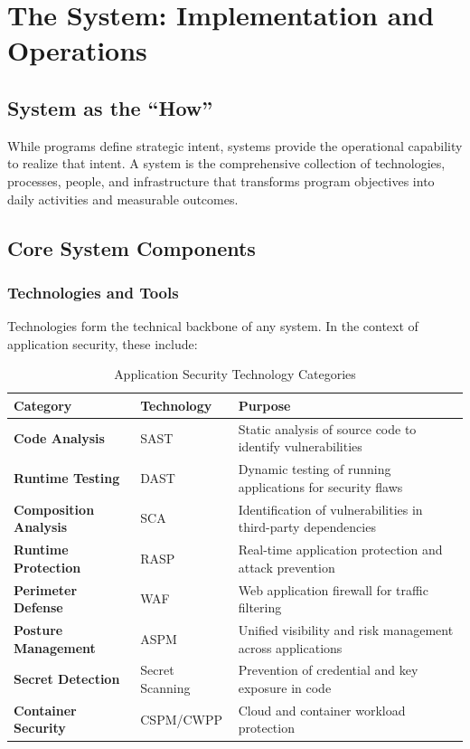 \documentclass[11pt,letterpaper]{article}
\begin{document}
\section{The System: Implementation and Operations}

\subsection{System as the ``How''}

While programs define strategic intent, systems provide the operational capability to realize that intent. A system is the comprehensive collection of technologies, processes, people, and infrastructure that transforms program objectives into daily activities and measurable outcomes.

\subsection{Core System Components}

\subsubsection{Technologies and Tools}

Technologies form the technical backbone of any system. In the context of application security, these include:

\begin{table}[H]
\centering
\renewcommand{\arraystretch}{1.3}
\begin{tabularx}{\textwidth}{>{\bfseries}l l X}
\toprule
\textbf{Category} & \textbf{Technology} & \textbf{Purpose} \\
\midrule
Code Analysis & SAST & Static analysis of source code to identify vulnerabilities \\
Runtime Testing & DAST & Dynamic testing of running applications for security flaws \\
Composition Analysis & SCA & Identification of vulnerabilities in third-party dependencies \\
Runtime Protection & RASP & Real-time application protection and attack prevention \\
Perimeter Defense & WAF & Web application firewall for traffic filtering \\
Posture Management & ASPM & Unified visibility and risk management across applications \\
Secret Detection & Secret Scanning & Prevention of credential and key exposure in code \\
Container Security & CSPM/CWPP & Cloud and container workload protection \\
\bottomrule
\end{tabularx}
\caption{Application Security Technology Categories}
\label{tab:security-technologies}
\end{table}
\end{document}
